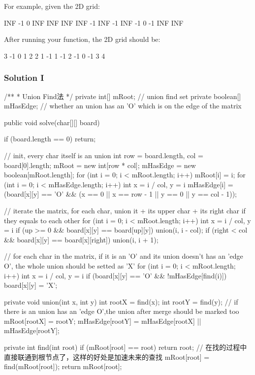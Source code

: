 For example, given the 2D grid:

\begin{Code}
INF  -1  0  INF
INF INF INF  -1
INF  -1 INF  -1
  0  -1 INF INF
\end{Code}

After running your function, the 2D grid should be:

\begin{Code}
  3  -1   0   1
  2   2   1  -1
  1  -1   2  -1
  0  -1   3   4
\end{Code}

\newpage

\subsubsection{Solution I}

\begin{Code}
/**
 * Union Find法
 */
private int[] mRoot; // union find set
private boolean[] mHasEdge; // whether an union has an 'O' which is on the edge of the matrix

public void solve(char[][] board) {
    if (board.length == 0) {
        return;
    }

    // init, every char itself is an union
    int row = board.length, col = board[0].length;
    mRoot = new int[row * col];
    mHasEdge = new boolean[mRoot.length];
    for (int i = 0; i < mRoot.length; i++) {
        mRoot[i] = i;
    }
    for (int i = 0; i < mHasEdge.length; i++) {
        int x = i / col, y = i %
        mHasEdge[i] = (board[x][y] == 'O' && (x == 0 || x == row - 1 || y == 0 || y == col - 1));
    }

    // iterate the matrix, for each char, union it + its upper char + its right char if they equals to each other
    for (int i = 0; i < mRoot.length; i++) {
        int x = i / col, y = i %
        if (up >= 0 && board[x][y] == board[up][y]) union(i, i - col);
        if (right < col && board[x][y] == board[x][right]) union(i, i + 1);
    }

    // for each char in the matrix, if it is an 'O' and its union doesn't has an 'edge O', the whole union should be setted as 'X'
    for (int i = 0; i < mRoot.length; i++) {
        int x = i / col, y = i %
        if (board[x][y] == 'O' && !mHasEdge[find(i)])
            board[x][y] = 'X';
    }
}

private void union(int x, int y) {
    int rootX = find(x);
    int rootY = find(y);
    // if there is an union has an 'edge O',the union after merge should be marked too
    mRoot[rootX] = rootY;
    mHasEdge[rootY] = mHasEdge[rootX] || mHasEdge[rootY];
}

private int find(int root) {
    if (mRoot[root] == root) {
        return root;
    }
    // 在找的过程中直接联通到根节点了，这样的好处是加速未来的查找
    mRoot[root] = find(mRoot[root]);
    return mRoot[root];
}
\end{Code}

